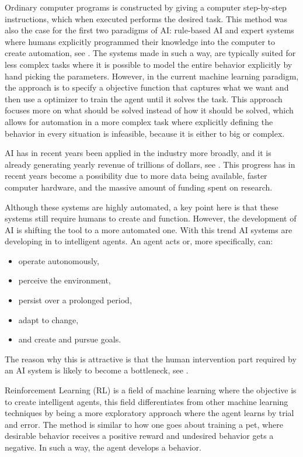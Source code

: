\documentclass[12pt,A4]{report}
\theoremstyle{definition}
\begin{document}
Ordinary computer programs is constructed by giving a computer step-by-step instructions, which when executed performs the desired task. This method was also the case for the first two paradigms of AI: rule-based AI and expert systems where humans explicitly programmed their knowledge into the computer to create automation, see \citet[\textbf{CHAP}]{Bostrom14}. The systems made in such a way, are typically suited for less complex tasks where it is possible to model the entire behavior explicitly by hand picking the parameters. However, in the current machine learning paradigm, the approach is to specify a objective function that captures what we want and then use a optimizer to train the agent until it solves the task. This approach focuses more on what should be solved instead of how it should be solved, which allows for automation in a more complex task where explicitly defining the behavior in every situation is infeasible, because it is either to big or complex. 

AI has in recent years been applied in the industry more broadly, and it is already generating yearly revenue of trillions of dollars, see \citet[p.19]{RusselNorvig}. This progress has in recent years become a possibility due to more data being available, faster computer hardware, and the massive amount of funding spent on research. 

Although these systems are highly automated, a key point here is that these systems still require humans to create and function. However, the development of AI is shifting the tool to a more automated one. With this trend AI systems are developing in to intelligent agents. An agent acts or, more specifically, can:
\begin{itemize}
  \item operate autonomously,
  \item perceive the environment,
  \item persist over a prolonged period,
  \item adapt to change,
  \item and create and pursue goals.
\end{itemize}
The reason why this is attractive is that the human intervention part required by an AI system is likely to become a bottleneck, see \citet[\textbf{PAGE}]{TankandeMaskiner}.

Reinforcement Learning (RL) is a field of machine learning where the objective is to create intelligent agents, this field differentiates from other machine learning techniques by being a more exploratory approach where the agent learns by trial and error. The method is similar to how one goes about training a pet, where desirable behavior receives a positive reward and undesired behavior gets a negative. In such a way, the agent develops a behavior. %
\end{document}
